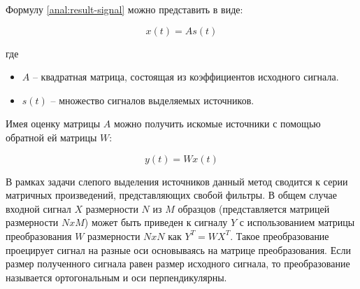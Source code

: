 

Формулу \ref{anal:result-signal} можно представить в виде:

\begin{equation}
x(t) = As(t)
\end{equation}

где

\begin{itemize}
	\item $A$ -- квадратная матрица, состоящая из коэффициентов исходного сигнала.
	\item $s(t)$ -- множество сигналов выделяемых источников.
\end{itemize}

Имея оценку матрицы $A$ можно получить искомые источники с помощью обратной ей матрицы $W$:

\begin{equation}
y(t) = Wx(t)
\end{equation}

В рамках задачи слепого выделения источников данный метод сводится к серии матричных произведений, представляющих свобой фильтры. В общем случае входной сигнал $X$ размерности $N$ из $M$ образцов (представляется матрицей размерности $NxM$) может быть приведен к сигналу $Y$ с использованием матрицы преобразования $W$ размерности $NxN$ как $Y^T = WX^T$. Такое преобразование проецирует сигнал на разные оси основываясь на матрице преобразования. Если размер полученного сигнала равен размер исходного сигнала, то преобразование называется ортогональным и оси перпендикулярны.

